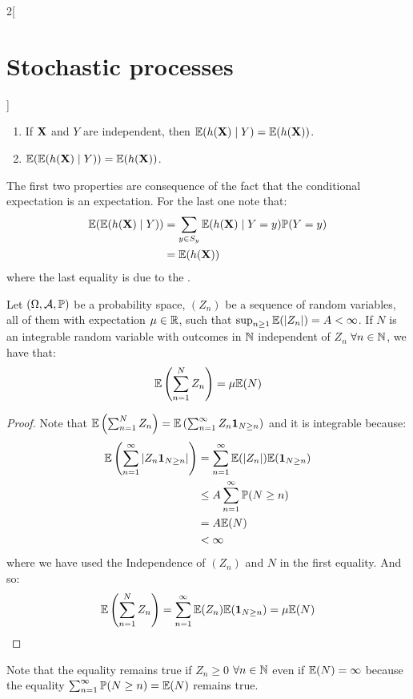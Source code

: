 \documentclass[../../../main_math.tex]{subfiles}
\begin{document}
\begin{multicols}{2}[\section{Stochastic processes}]
\begin{proposition}
\begin{enumerate}
      \item If $\boldsymbol{\mathrm{X}}$ and $Y$ are independent, then $\mathbb{E}(h(\boldsymbol{\mathrm{X}})\mid Y)=\mathbb{E}(h(\boldsymbol{\mathrm{X}}))$.
      \item $\mathbb{E}(\mathbb{E}(h(\boldsymbol{\mathrm{X}})\mid Y))=\mathbb{E}(h(\boldsymbol{\mathrm{X}}))$.
    \end{enumerate}
  \end{proposition}
  \begin{sproof}
    The first two properties are consequence of the fact that the conditional expectation is an expectation. For the last one note that:
    \begin{align*}
      \mathbb{E}(\mathbb{E}(h(\boldsymbol{\mathrm{X}})\mid Y)) & =\sum_{y\in S_y}\mathbb{E}(h(\boldsymbol{\mathrm{X}})\mid Y=y)\mathbb{P}(Y=y) \\
                                  & =\mathbb{E}(h(\boldsymbol{\mathrm{X}}))
    \end{align*}
    where the last equality is due to the .
  \end{sproof}
  \begin{theorem}
    Let $(\Omega,\mathcal{A},\mathbb{P})$ be a probability space, $(Z_n)$ be a sequence of random variables, all of them with expectation $\mu\in\mathbb{R}$, such that $\sup_{n\geq 1}\mathbb{E}(\abs{Z_n})=A<\infty$. If $N$ is an integrable random variable with outcomes in $\mathbb{N}$ independent of $Z_n$ $\forall n\in\mathbb{N}$, we have that:
    $$\mathbb{E}\left(\sum_{n=1}^NZ_n\right)=\mu\mathbb{E}(N)$$
  \end{theorem}
  \begin{proof}
    Note that $\mathbb{E}\left(\sum_{n=1}^NZ_n\right)=\mathbb{E}\left(\sum_{n=1}^\infty Z_n\boldsymbol{\mathrm{1}}_{N\geq n}\right)$ and it is integrable because:
    \begin{align*}
      \mathbb{E}\left(\sum_{n=1}^\infty \abs{Z_n\boldsymbol{\mathrm{1}}_{N\geq n}}\right) & =\sum_{n=1}^\infty \mathbb{E}(\abs{Z_n})\mathbb{E}(\boldsymbol{\mathrm{1}}_{N\geq n}) \\
                                                                 & \leq A\sum_{n=1}^\infty \mathbb{P}(N\geq n)                 \\
                                                                 & =A\mathbb{E}(N)                                              \\
                                                                 & <\infty
    \end{align*}
    where we have used the Independence of $(Z_n)$ and $N$ in the first equality.
    And so:
    $$\mathbb{E}\left(\sum_{n=1}^NZ_n\right)=\sum_{n=1}^\infty \mathbb{E}(Z_n)\mathbb{E}(\boldsymbol{\mathrm{1}}_{N\geq n})=\mu\mathbb{E}(N)$$
  \end{proof}
  \begin{remark}
    Note that the equality remains true if $Z_n\geq 0$ $\forall n\in\mathbb{N}$ even if $\mathbb{E}(N)=\infty$ because the equality $\sum_{n=1}^\infty \mathbb{P}(N\geq n)=\mathbb{E}(N)$ remains true.
  \end{remark}

\end{multicols}
\end{document}
